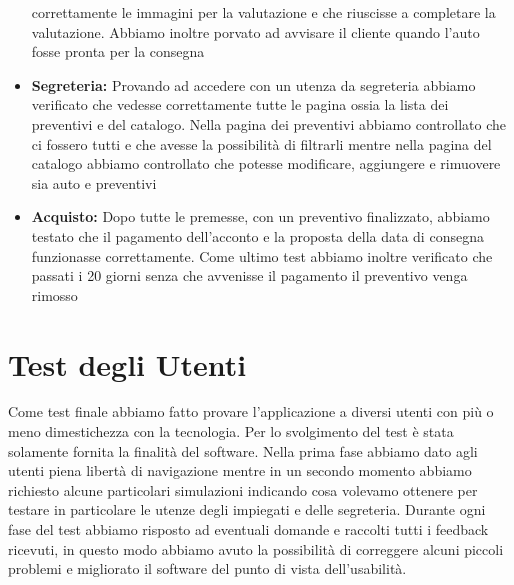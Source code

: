 \documentclass[a4paper, 11pt,oneside]{book}
\begin{document}
\begin{itemize}
            correttamente le immagini per la valutazione e che riuscisse a completare la valutazione. Abbiamo inoltre porvato ad avvisare il cliente quando l'auto fosse pronta per la consegna
            \item \textbf{Segreteria:} Provando ad accedere con un utenza da segreteria abbiamo verificato che vedesse correttamente tutte le pagina ossia la lista dei preventivi e del catalogo. Nella pagina dei preventivi abbiamo controllato che ci fossero tutti e che avesse la possibilità di filtrarli mentre
            nella pagina del catalogo abbiamo controllato che potesse modificare, aggiungere e rimuovere sia auto e preventivi
            \item \textbf{Acquisto:} Dopo tutte le premesse, con un preventivo finalizzato, abbiamo testato che il pagamento dell'acconto e la proposta della data di consegna funzionasse correttamente. Come ultimo test abbiamo inoltre verificato che passati i 20 giorni senza che avvenisse il pagamento il preventivo
            venga rimosso
        \end{itemize}
    \section{Test degli Utenti}
    Come test finale abbiamo fatto provare l'applicazione a diversi utenti con più o meno dimestichezza con la tecnologia. Per lo svolgimento del test è stata solamente fornita la finalità del software. Nella prima fase abbiamo dato agli utenti piena libertà di navigazione mentre in un secondo momento abbiamo richiesto
    alcune particolari simulazioni indicando cosa volevamo ottenere per testare in particolare le utenze degli impiegati e delle segreteria. Durante ogni fase del test abbiamo risposto ad eventuali domande e raccolti tutti i feedback ricevuti, in questo modo abbiamo avuto la possibilità di correggere alcuni piccoli 
    problemi e migliorato
    il software del punto di vista dell'usabilità.



\end{document}
